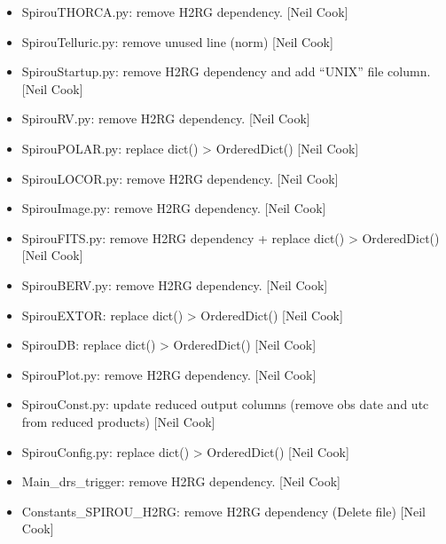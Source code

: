 \documentclass[a4paper,10pt,english]{report}
\begin{document}
\begin{itemize}
\item {} 
SpirouTHORCA.py: remove H2RG dependency. {[}Neil Cook{]}

\item {} 
SpirouTelluric.py: remove unused line (norm) {[}Neil Cook{]}

\item {} 
SpirouStartup.py: remove H2RG dependency and add “UNIX” file column.
{[}Neil Cook{]}

\item {} 
SpirouRV.py: remove H2RG dependency. {[}Neil Cook{]}

\item {} 
SpirouPOLAR.py: replace dict() \textendash{}\textgreater{} OrderedDict() {[}Neil Cook{]}

\item {} 
SpirouLOCOR.py: remove H2RG dependency. {[}Neil Cook{]}

\item {} 
SpirouImage.py: remove H2RG dependency. {[}Neil Cook{]}

\item {} 
SpirouFITS.py: remove H2RG dependency + replace dict() \textendash{}\textgreater{}
OrderedDict() {[}Neil Cook{]}

\item {} 
SpirouBERV.py: remove H2RG dependency. {[}Neil Cook{]}

\item {} 
SpirouEXTOR: replace dict() \textendash{}\textgreater{} OrderedDict() {[}Neil Cook{]}

\item {} 
SpirouDB: replace dict() \textendash{}\textgreater{} OrderedDict() {[}Neil Cook{]}

\item {} 
SpirouPlot.py: remove H2RG dependency. {[}Neil Cook{]}

\item {} 
SpirouConst.py: update reduced output columns (remove obs date and utc
from reduced products) {[}Neil Cook{]}

\item {} 
SpirouConfig.py: replace dict() \textendash{}\textgreater{} OrderedDict() {[}Neil Cook{]}

\item {} 
Main\_drs\_trigger: remove H2RG dependency. {[}Neil Cook{]}

\item {} 
Constants\_SPIROU\_H2RG: remove H2RG dependency (Delete file) {[}Neil
Cook{]}


\end{itemize}
\end{document}
